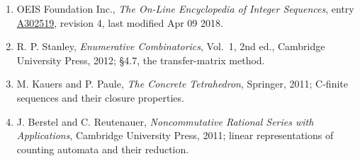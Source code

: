 \documentclass[11pt]{article}
\theoremstyle{definition}
\begin{document}
\begin{enumerate}

\item OEIS Foundation Inc., \emph{The On-Line Encyclopedia of Integer Sequences}, entry \href{https://oeis.org/A302519}{A302519}, revision 4, last modified Apr 09 2018.

\item R. P. Stanley, \emph{Enumerative Combinatorics}, Vol.~1, 2nd ed., Cambridge University Press, 2012; \S4.7, the transfer-matrix method.

\item M. Kauers and P. Paule, \emph{The Concrete Tetrahedron}, Springer, 2011; C-finite sequences and their closure properties.

\item J. Berstel and C. Reutenauer, \emph{Noncommutative Rational Series with Applications}, Cambridge University Press, 2011; linear representations of counting automata and their reduction.

\end{enumerate}
\end{document}
